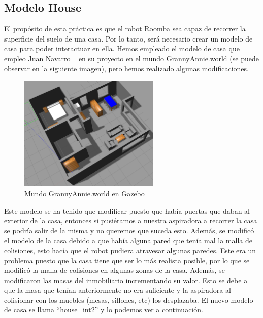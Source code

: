 \subsection{Modelo House}
El propósito de esta práctica es que el robot Roomba sea capaz de recorrer la superficie del suelo de una casa. Por lo tanto, será necesario crear un modelo de casa para poder interactuar en ella. Hemos empleado el modelo de casa que empleo Juan Navarro ~\cite{localization1} en su proyecto en el mundo GrannyAnnie.world (se puede observar en la siguiente imagen), pero hemos realizado algunas modificaciones.\\

\begin{figure}[H]
  \begin{center}
    \includegraphics[width=0.6\textwidth]{figures/Vacuum/ModeloCasa_antiguo.png}
		\caption{Mundo GrannyAnnie.world en Gazebo}
		\label{fig.modelocasa_antiguo}
		\end{center}
\end{figure}

Este modelo se ha tenido que modificar puesto que había puertas que daban al exterior de la casa, entonces si pusiéramos a nuestra aspiradora a recorrer la casa se podría salir de la misma y no queremos que suceda esto. Además, se modificó el modelo de la casa debido a que había alguna pared que tenía mal la malla de colisiones, esto hacía que el robot pudiera atravesar algunas paredes. Este era un problema puesto que la casa tiene que ser lo más realista posible, por lo que se modificó la malla de colisiones en algunas zonas de la casa. Además, se modificaron las masas del inmobiliario incrementando su valor. Esto se debe a que la masa que tenían anteriormente no era suficiente y la aspiradora al colisionar con los muebles (mesas, sillones, etc) los desplazaba. El nuevo modelo de casa se llama ``house\_int2'' y lo podemos ver a continuación.\\

